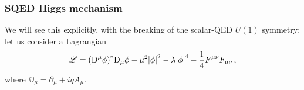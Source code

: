 \documentclass[main.tex]{subfiles}
\begin{document}
\subsubsection{SQED Higgs mechanism}

We will see this explicitly, with the breaking of the scalar-QED \(U(1)\) symmetry: let us consider a Lagrangian 
%
\begin{align}
\mathscr{L} = \qty(\mathrm{D}^{\mu } \phi )^{*} \mathrm{D}_{\mu } \phi 
- \mu^2 \abs{\phi}^2 - \lambda \abs{\phi }^4
- \frac{1}{4} F^{\mu \nu } F_{\mu \nu }
\,,
\end{align}
%
where \(\DD_{\mu } = \partial_{\mu } + iq A_{\mu} \).



\end{document}
